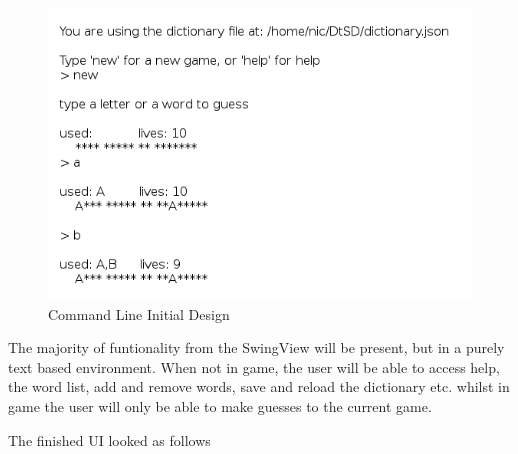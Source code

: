 \documentclass[a4paper, 11pt]{article}
\begin{document}
\begin{figure}[H]
\centering
\includegraphics[scale=0.75]{./res/CliViewDesign.png}
\caption{Command Line Initial Design}
\label{CliView}
\end{figure}

The majority of funtionality from the SwingView will be present, but in a purely text based environment. When not in game, the user will be able to access help, the word list, add and remove words, save and reload the dictionary etc. whilst in game the user will only be able to make guesses to the current game.

The finished UI looked as follows
\end{document}
